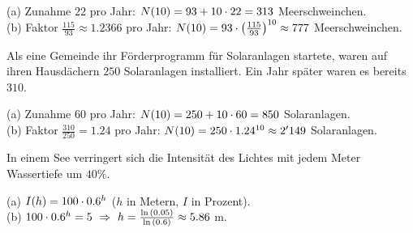 \documentclass[11pt]{exam}
\begin{document}
\begin{questions}
{\begin{solution}
		(a) Zunahme $22$ pro Jahr: $N(10)=93+10\cdot22=313$ Meerschweinchen.\\
		(b) Faktor $\frac{115}{93}\approx1.2366$ pro Jahr: $N(10)=93\cdot\left(\frac{115}{93}\right)^{10}\approx777$ Meerschweinchen.
\end{solution}}
{}

\question[4]
Als eine Gemeinde ihr Förderprogramm für Solaranlagen startete, waren auf ihren Hausdächern $250$ Solaranlagen installiert. Ein Jahr später waren es bereits $310$.
{\begin{solution}
		(a) Zunahme $60$ pro Jahr: $N(10)=250+10\cdot60=850$ Solaranlagen.\\
		(b) Faktor $\frac{310}{250}=1.24$ pro Jahr: $N(10)=250\cdot1.24^{10}\approx2'149$ Solaranlagen.
\end{solution}}
{}


\question[4]
In einem See verringert sich die Intensität des Lichtes mit jedem Meter Wassertiefe um $40\%$.
{\begin{solution}
		(a) $I(h)=100\cdot0.6^h$ ($h$ in Metern, $I$ in Prozent).\\
		(b) $100\*0.6^h=5\ \Rightarrow\ h=\frac{\ln{0.05}}{\ln{0.6}}\approx5.86$ m.
\end{solution}}
{}


\end{questions}
\end{document}
